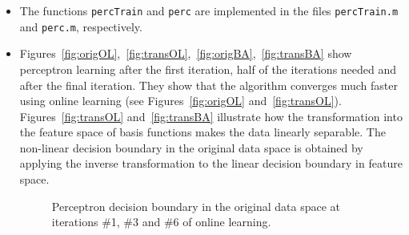 \documentclass[a4]{article}
\begin{document}
\begin{itemize}
\item The functions \texttt{percTrain} and \texttt{perc} are implemented in the files \texttt{percTrain.m} and \texttt{perc.m}, respectively.

\item Figures~\ref{fig:origOL},~\ref{fig:transOL},~\ref{fig:origBA},~\ref{fig:transBA} show perceptron learning after the first iteration, half of the iterations needed and after the final iteration. They show that the algorithm converges much faster using online learning (see Figures~\ref{fig:origOL} and~\ref{fig:transOL}). Figures~\ref{fig:transOL} and~\ref{fig:transBA} illustrate how the transformation into the feature space of basis functions makes the data linearly separable. The non-linear decision boundary in the original data space is obtained by applying the inverse transformation to the linear decision boundary in feature space.
\begin{figure}[h!]
\centering
\caption{Perceptron decision boundary in the original data space at iterations \#1, \#3 and \#6 of online learning.}

\end{figure}
\end{itemize}
\end{document}
